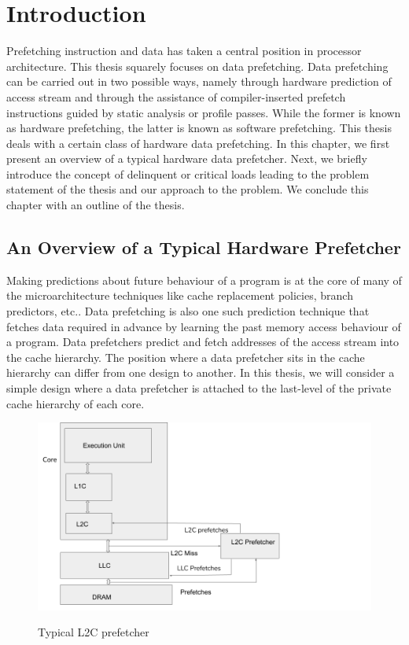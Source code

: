 \chapter{Introduction}

Prefetching instruction and data has taken a central position in processor architecture. This thesis squarely focuses on data prefetching. Data prefetching can be carried out in two possible ways, namely through hardware prediction of access stream and through the assistance of compiler-inserted prefetch instructions guided by static analysis or profile passes. While the former is known as hardware prefetching, the latter is known as software prefetching. This thesis deals with a certain class of hardware data prefetching. In this chapter, we first present an overview of a typical hardware data prefetcher. Next, we briefly introduce the concept of delinquent or critical loads leading to the problem statement of the thesis and our approach to the problem. We conclude this chapter with an outline of the thesis.

\section{ An Overview of a Typical Hardware Prefetcher }
Making predictions about future behaviour of a program is at the core of many of the microarchitecture techniques like cache replacement policies, branch predictors, etc..
Data prefetching is also one such prediction technique that fetches data required in advance by learning the past memory access behaviour of a program. Data prefetchers predict and fetch addresses of the access stream into the cache hierarchy. The position where a data prefetcher sits in the cache hierarchy can differ from one design to another. In this thesis, we will consider a simple design where a data prefetcher is attached to the last-level of the private cache hierarchy of each core.
\begin{figure}[H]
{\includegraphics[scale=0.5]{images/L2CPrefetcher.png}}
\caption{Typical L2C prefetcher }\label{fig:L2CPrefetcher}
\end{figure}

